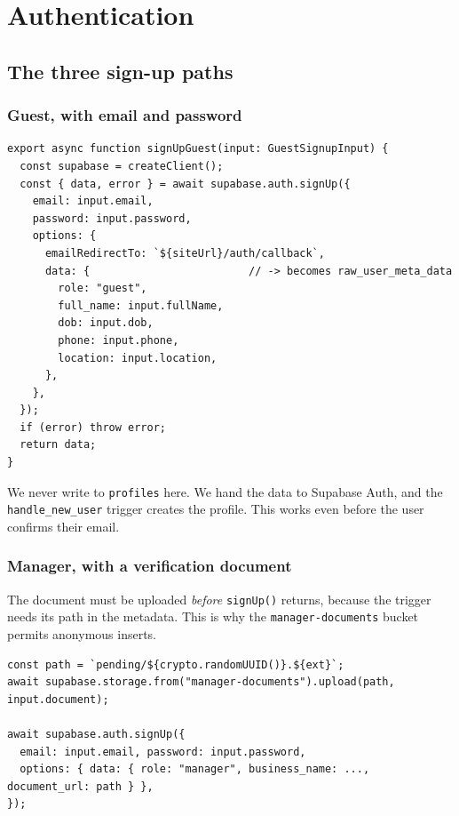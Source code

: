 \documentclass[11pt,a4paper]{article}
\begin{document}
\newpage
\section{Authentication}

\subsection{The three sign-up paths}

\subsubsection{Guest, with email and password}

\begin{lstlisting}[language=TS,caption={lib/auth.ts}]
export async function signUpGuest(input: GuestSignupInput) {
  const supabase = createClient();
  const { data, error } = await supabase.auth.signUp({
    email: input.email,
    password: input.password,
    options: {
      emailRedirectTo: `${siteUrl}/auth/callback`,
      data: {                         // -> becomes raw_user_meta_data
        role: "guest",
        full_name: input.fullName,
        dob: input.dob,
        phone: input.phone,
        location: input.location,
      },
    },
  });
  if (error) throw error;
  return data;
}
\end{lstlisting}

We never write to \texttt{profiles} here. We hand the data to Supabase Auth, and
the \texttt{handle\_new\_user} trigger creates the profile. This works even
before the user confirms their email.

\subsubsection{Manager, with a verification document}

The document must be uploaded \emph{before} \texttt{signUp()} returns, because
the trigger needs its path in the metadata. This is why the
\texttt{manager-documents} bucket permits anonymous inserts.

\begin{lstlisting}[language=TS,caption={lib/auth.ts}]
const path = `pending/${crypto.randomUUID()}.${ext}`;
await supabase.storage.from("manager-documents").upload(path, input.document);

await supabase.auth.signUp({
  email: input.email, password: input.password,
  options: { data: { role: "manager", business_name: ..., document_url: path } },
});
\end{lstlisting}
\end{document}
